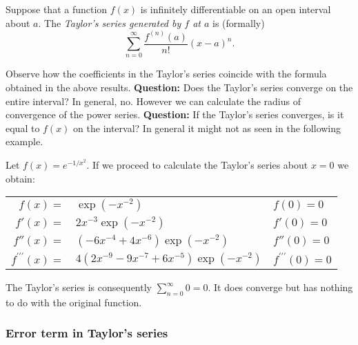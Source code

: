 \begin{definition}%
  \label{def:taylor}
  Suppose that a function \(f(x)\) is infinitely differentiable on an open interval about \(a\).
  The \emph{Taylor's series generated by \(f\) at \(a\)} is (formally)
  \[
    \sum_{n=0}^{\infty} \frac{f^{(n)}(a)}{n!} {(x-a)}^{n}.
  \]
\end{definition}

Observe how the coefficients in the Taylor's series coincide with the formula obtained in the above results.
\textbf{Question:}
Does the Taylor's series converge on the entire interval?
In general, no. However we can calculate the radius of convergence of the power series.
\textbf{Question:}
If the Taylor's series converges, is it equal to \(f(x)\) on the interval?
{In general it might not as seen in the following example.}

\begin{example*}
  Let  \(f(x) = e^{-1/x^2}\).
  If we proceed to calculate the Taylor's series about \(x=0\) we obtain:

  \begin{tabular}{ r l  l}
    \(f(x) = \)
     & \hspace{-0.7em}\( \exp(-x^{-2})\)
     & \(f(0)=0\)                                                         \\
    \(f'(x)=\)
     & \hspace{-0.7em}\( 2x^{-3} \exp(-x^{-2})\)
     & \(f'(0)=0\)                                                        \\
    \(f''(x)=\)
     & \hspace{-0.7em}\( (-6 x^{-4}   + 4x^{-6} )\exp(-x^{-2})  \)
     & \(f''(0)=0\)                                                       \\
    \(f^{\prime\prime\prime}(x)=\)
     & \hspace{-0.7em}\( 4 (2x^{-9} - 9 x^{-7} + 6 x^{-5})\exp(-x^{-2})\)
     & \(f^{\prime\prime\prime}(0)=0\)
  \end{tabular}

  \noindent
  The Taylor's series is consequently \(\sum_{n=0}^{\infty} 0 = 0\).
  It does converge but has nothing to do with the original function.
\end{example*}



\subsubsection*{Error term in Taylor's series}

